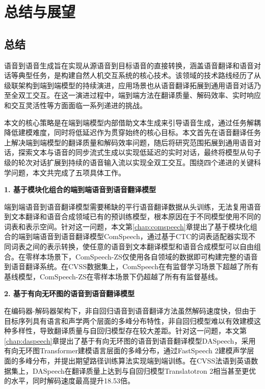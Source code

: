 \chapter{总结与展望}\label{chap:conclusion}

\section{总结}

语音到语音生成旨在实现从源语音到目标语音的直接转换，涵盖语音翻译和语音对话等典型任务，是构建自然人机交互系统的核心技术。该领域的技术路线经历了从级联架构到端到端模型的持续演进，应用场景也从语音翻译拓展到通用语音对话乃至全双工交互。在这一演进过程中，端到端方法在翻译质量、解码效率、实时响应和交互灵活性等方面面临一系列递进的挑战。

本文的核心策略是在端到端模型内部借助文本生成来引导语音生成，通过任务解耦降低建模难度，同时将低延迟作为贯穿始终的核心目标。本文首先在语音翻译任务上解决端到端模型的翻译质量和解码效率问题，随后将研究范围拓展到通用语音对话，探索文本与语音的同步流式生成以实现低延迟的实时对话，最终将模型从句子级的轮次对话扩展到持续的语音输入流以实现全双工交互。围绕四个递进的关键科学问题，本文共完成了五项具体工作。

\textbf{1. 基于模块化组合的端到端语音到语音翻译模型}

端到端语音到语音翻译模型需要稀缺的平行语音翻译数据从头训练，无法复用语音到文本翻译和语音合成领域已有的预训练模型，根本原因在于不同模型使用不同的词表和表示空间。针对这一问题，本文第\ref{chap:comspeech}章提出了基于模块化组合的端到端语音到语音翻译模型ComSpeech，通过基于CTC的词表适配器实现不同词表之间的表示转换，使任意的语音到文本翻译模型和语音合成模型可以自由组合。在零样本场景下，ComSpeech-ZS仅使用各自领域的数据即可构建完整的语音到语音翻译系统。在CVSS数据集上，ComSpeech在有监督学习场景下超越了所有基线模型，ComSpeech-ZS在零样本场景下仍超越了所有有监督基线。

\textbf{2. 基于有向无环图的语音到语音翻译模型}

在编码器-解码器架构下，非自回归语音到语音翻译方法虽然解码速度快，但由于目标序列具有语言和声学两个层面的多峰分布特性，非自回归模型难以有效建模这种多样性，导致翻译质量与自回归模型存在较大差距。针对这一问题，本文第\ref{chap:daspeech}章提出了基于有向无环图的语音到语音翻译模型DASpeech，采用有向无环图Transformer建模语言层面的多峰分布，通过FastSpeech 2建模声学层面的多峰分布，并提出期望路径训练算法实现端到端训练。在CVSS法语到英语数据集上，DASpeech在翻译质量上达到与自回归模型Translatotron 2相当甚至更优的水平，同时解码速度最高提升18.53倍。

